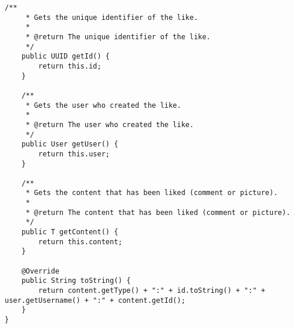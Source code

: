 \begin{lstlisting}[style=JavaStyle, caption={Like Class}, label={lst:likeable-codesnippet}]
    /**
     * Gets the unique identifier of the like.
     *
     * @return The unique identifier of the like.
     */
    public UUID getId() {
        return this.id;
    }

    /**
     * Gets the user who created the like.
     *
     * @return The user who created the like.
     */
    public User getUser() {
        return this.user;
    }

    /**
     * Gets the content that has been liked (comment or picture).
     *
     * @return The content that has been liked (comment or picture).
     */
    public T getContent() {
        return this.content;
    }

    @Override
    public String toString() {
        return content.getType() + ":" + id.toString() + ":" + user.getUsername() + ":" + content.getId();
    }
}
\end{lstlisting}
